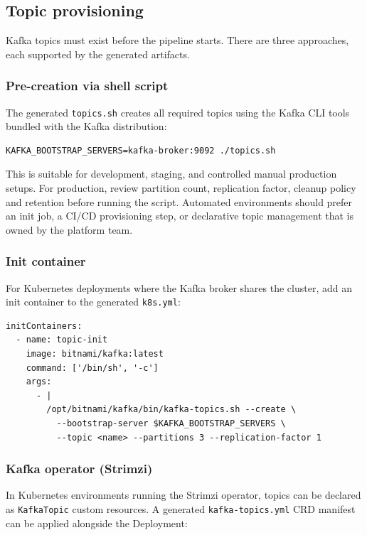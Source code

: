 \subsection{Topic provisioning}

Kafka topics must exist before the pipeline starts. There are three approaches,
each supported by the generated artifacts.

\subsubsection{Pre-creation via shell script}

The generated \texttt{topics.sh} creates all required topics using the Kafka
CLI tools bundled with the Kafka distribution:

\begin{verbatim}
KAFKA_BOOTSTRAP_SERVERS=kafka-broker:9092 ./topics.sh
\end{verbatim}

This is suitable for development, staging, and controlled manual production
setups. For production, review partition count, replication factor, cleanup
policy and retention before running the script. Automated environments should
prefer an init job, a CI/CD provisioning step, or declarative topic management
that is owned by the platform team.

\subsubsection{Init container}

For Kubernetes deployments where the Kafka broker shares the cluster,
add an init container to the generated \texttt{k8s.yml}:

\begin{verbatim}
initContainers:
  - name: topic-init
    image: bitnami/kafka:latest
    command: ['/bin/sh', '-c']
    args:
      - |
        /opt/bitnami/kafka/bin/kafka-topics.sh --create \
          --bootstrap-server $KAFKA_BOOTSTRAP_SERVERS \
          --topic <name> --partitions 3 --replication-factor 1
\end{verbatim}

\subsubsection{Kafka operator (Strimzi)}

In Kubernetes environments running the Strimzi operator, topics can be
declared as \texttt{KafkaTopic} custom resources. A generated
\texttt{kafka-topics.yml} CRD manifest can be applied alongside the
Deployment:


